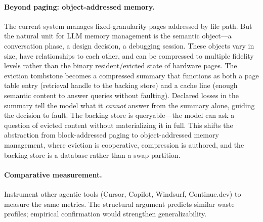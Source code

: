 \paragraph{Beyond paging: object-addressed memory.}
The current system manages fixed-granularity pages addressed by file
path. But the natural unit for LLM memory management is the semantic
object---a conversation phase, a design decision, a debugging session.
These objects vary in size, have relationships to each other, and can
be compressed to multiple fidelity levels rather than the binary
resident/evicted state of hardware pages. The eviction tombstone
becomes a compressed summary that functions as both a page table
entry (retrieval handle to the backing store) and a cache line
(enough semantic content to answer queries without faulting).
Declared losses in the summary tell the model what it \emph{cannot}
answer from the summary alone, guiding the decision to fault.
The backing store is queryable---the model can ask a question of
evicted content without materializing it in full. This shifts the
abstraction from block-addressed paging to object-addressed memory
management, where eviction is cooperative, compression is authored,
and the backing store is a database rather than a swap partition.

\paragraph{Comparative measurement.}
Instrument other agentic tools (Cursor, Copilot, Windsurf,
Continue.dev) to measure the same metrics. The structural argument
predicts similar waste profiles; empirical confirmation would
strengthen generalizability.

